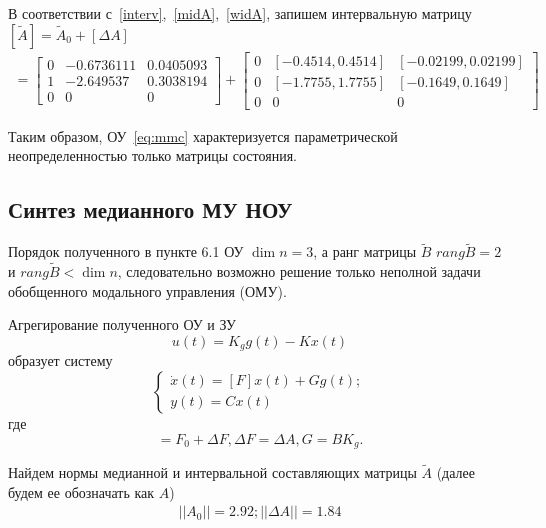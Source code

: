 В соответствии с~\ref{interv},~\ref{midA},~\ref{widA}, запишем интервальную матрицу $[\tilde{A}] = \tilde{A}_0 + [\Delta A]$
\begin{align}
	[\tilde{A}] =
	\begin{bmatrix}
	    0&  - 0.6736111 &   0.0405093  \\
		1&  - 2.649537  &   0.3038194  \\
		0&    0        & 0 
	\end{bmatrix}
	+
	\begin{bmatrix}
		0&	[- 0.4514, 0.4514]	&[-0.02199, 0.02199] \\
		0&	[-1.7755, 1.7755]	&[-0.1649, 0.1649]\\
		0&0&0
	\end{bmatrix}
\end{align}

Таким образом, ОУ~\ref{eq:mmc} характеризуется параметрической неопределенностью только матрицы состояния.


\subsection{Синтез медианного МУ НОУ}

Порядок полученного в пункте 6.1 ОУ $\dim n = 3$, а ранг матрицы $\tilde{B}$ $rang \tilde{B} = 2$ и $rang \tilde{B} < \dim n$, следовательно возможно решение только неполной задачи обобщенного модального управления (ОМУ).

Агрегирование полученного ОУ и ЗУ
\begin{equation}
	u (t) = K_g g(t) - K x(t)
\end{equation}
образует систему 
\begin{equation}
	\begin{cases}
		\dot x (t) = [F] x(t) + G g(t);\\
		y(t) = C x(t)
	\end{cases}
\end{equation}
где 
\begin{equation}
	[F] = F_0 + \Delta F, \Delta F = \Delta A, G = B K_g.
\end{equation}

Найдем нормы медианной и интервальной составляющих матрицы $\tilde{A}$ (далее будем ее обозначать как $A$)
\begin{align}
    ||A_0|| = 2.92; ||\Delta A|| = 1.84
\end{align}


